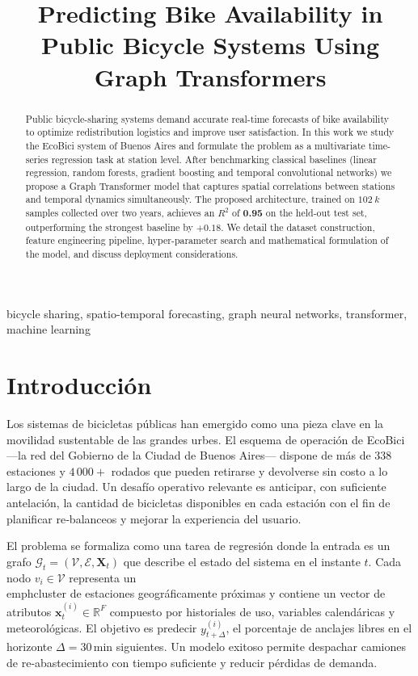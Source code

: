 \documentclass[conference]{IEEEtran}
\title{Predicting Bike Availability in Public Bicycle Systems Using Graph Transformers}
\author{\IEEEauthorblockN{Juan Francisco Doe\\}
\IEEEauthorblockA{Department of Computer Science\\University of Buenos Aires\\juan.francisco@example.com}
\and
\IEEEauthorblockN{Collaborators\\}
\IEEEauthorblockA{Faculty of Engineering\\University of Buenos Aires}}
\begin{document}
\maketitle

\begin{abstract}
Public bicycle-sharing systems demand accurate real-time forecasts of bike availability to optimize redistribution logistics and improve user satisfaction. In this work we study the EcoBici system of Buenos Aires and formulate the problem as a multivariate time-series regression task at station level. After benchmarking classical baselines (linear regression, random forests, gradient boosting and temporal convolutional networks) we propose a Graph Transformer model that captures spatial correlations between stations and temporal dynamics simultaneously. The proposed architecture, trained on $\SI{102}{k}$ samples collected over two years, achieves an $R^{2}$ of \textbf{0.95} on the held-out test set, outperforming the strongest baseline by $+0.18$. We detail the dataset construction, feature engineering pipeline, hyper-parameter search and mathematical formulation of the model, and discuss deployment considerations.
\end{abstract}

\begin{IEEEkeywords}
bicycle sharing, spatio-temporal forecasting, graph neural networks, transformer, machine learning
\end{IEEEkeywords}

\section{Introducción}
Los sistemas de bicicletas públicas han emergido como una pieza clave en la
movilidad sustentable de las grandes urbes. El esquema de operación de EcoBici
—la red del Gobierno de la Ciudad de Buenos Aires— dispone de más de $338$
estaciones y $4\,000+$ rodados que pueden retirarse y devolverse sin costo a lo
largo de la ciudad. Un desafío operativo relevante es anticipar, con suficiente
antelación, la cantidad de bicicletas disponibles en cada estación con el fin de
planificar re‐balanceos y mejorar la experiencia del usuario.

El problema se formaliza como una tarea de regresión donde la entrada es un
grafo $\mathcal{G}_t = (\mathcal{V}, \mathcal{E}, \mathbf{X}_t)$ que describe el
estado del sistema en el instante $t$. Cada nodo $v_i \in \mathcal{V}$ representa
un \\emph{cluster} de estaciones geográficamente próximas y contiene un vector
de atributos $\mathbf{x}_t^{(i)} \in \mathbb{R}^F$ compuesto por
historiales de uso, variables calendáricas y meteorológicas. El objetivo es
predecir $y_{t+\Delta}^{(i)}$, el porcentaje de anclajes libres en el horizonte
$\Delta = 30$\,min siguientes. Un modelo exitoso permite despachar camiones de
re‐abastecimiento con tiempo suficiente y reducir pérdidas de demanda.
\end{document}
